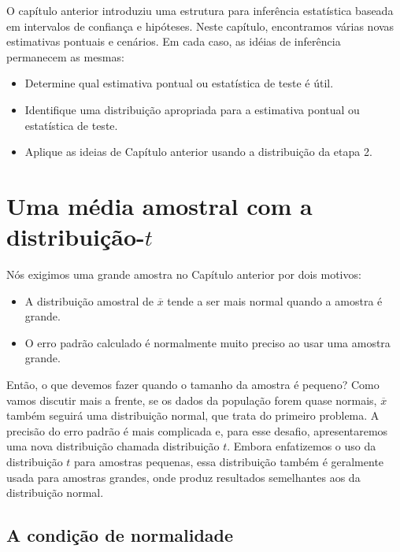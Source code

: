 \documentclass[
]{book}
\theoremstyle{definition}
\theoremstyle{definition}
\theoremstyle{definition}
\theoremstyle{definition}
\theoremstyle{remark}
\begin{document}
O capítulo anterior introduziu uma estrutura para inferência estatística baseada em intervalos de confiança e hipóteses. Neste capítulo, encontramos várias novas estimativas pontuais e cenários. Em cada caso, as idéias de inferência permanecem as mesmas:

\begin{itemize}
\item
  Determine qual estimativa pontual ou estatística de teste é útil.
\item
  Identifique uma distribuição apropriada para a estimativa pontual ou estatística de teste.
\item
  Aplique as ideias de Capítulo anterior usando a distribuição da etapa 2.
\end{itemize}

\hypertarget{oneSampleMeanTDistribution}{%
\section{\texorpdfstring{Uma média amostral com a distribuição-\(t\)}{Uma média amostral com a distribuição-t}}\label{oneSampleMeanTDistribution}}

Nós exigimos uma grande amostra no Capítulo anterior por dois motivos:

\begin{itemize}
\item
  A distribuição amostral de \(\overline{x}\) tende a ser mais normal quando a amostra é grande.
\item
  O erro padrão calculado é normalmente muito preciso ao usar uma amostra grande.
\end{itemize}

Então, o que devemos fazer quando o tamanho da amostra é pequeno? Como vamos discutir mais a frente, se os dados da população forem quase normais, \(\overline{x}\) também seguirá uma distribuição normal, que trata do primeiro problema. A precisão do erro padrão é mais complicada e, para esse desafio, apresentaremos uma nova distribuição chamada distribuição \(t\). Embora enfatizemos o uso da distribuição \(t\) para amostras pequenas, essa distribuição também é geralmente usada para amostras grandes, onde produz resultados semelhantes aos da distribuição normal.

\hypertarget{normalityCondition}{%
\subsection{A condição de normalidade}\label{normalityCondition}}
\end{document}
